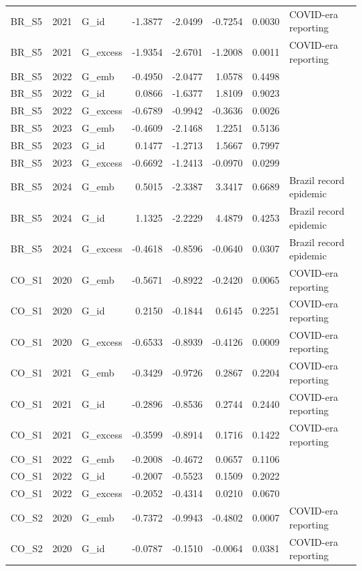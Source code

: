 \begin{tabular}{lllrrrrl}
BR\_S5 & 2021 & G\_id & -1.3877 & -2.0499 & -0.7254 & 0.0030 & COVID-era reporting \\
BR\_S5 & 2021 & G\_excess & -1.9354 & -2.6701 & -1.2008 & 0.0011 & COVID-era reporting \\
BR\_S5 & 2022 & G\_emb & -0.4950 & -2.0477 & 1.0578 & 0.4498 &  \\
BR\_S5 & 2022 & G\_id & 0.0866 & -1.6377 & 1.8109 & 0.9023 &  \\
BR\_S5 & 2022 & G\_excess & -0.6789 & -0.9942 & -0.3636 & 0.0026 &  \\
BR\_S5 & 2023 & G\_emb & -0.4609 & -2.1468 & 1.2251 & 0.5136 &  \\
BR\_S5 & 2023 & G\_id & 0.1477 & -1.2713 & 1.5667 & 0.7997 &  \\
BR\_S5 & 2023 & G\_excess & -0.6692 & -1.2413 & -0.0970 & 0.0299 &  \\
BR\_S5 & 2024 & G\_emb & 0.5015 & -2.3387 & 3.3417 & 0.6689 & Brazil record epidemic \\
BR\_S5 & 2024 & G\_id & 1.1325 & -2.2229 & 4.4879 & 0.4253 & Brazil record epidemic \\
BR\_S5 & 2024 & G\_excess & -0.4618 & -0.8596 & -0.0640 & 0.0307 & Brazil record epidemic \\
CO\_S1 & 2020 & G\_emb & -0.5671 & -0.8922 & -0.2420 & 0.0065 & COVID-era reporting \\
CO\_S1 & 2020 & G\_id & 0.2150 & -0.1844 & 0.6145 & 0.2251 & COVID-era reporting \\
CO\_S1 & 2020 & G\_excess & -0.6533 & -0.8939 & -0.4126 & 0.0009 & COVID-era reporting \\
CO\_S1 & 2021 & G\_emb & -0.3429 & -0.9726 & 0.2867 & 0.2204 & COVID-era reporting \\
CO\_S1 & 2021 & G\_id & -0.2896 & -0.8536 & 0.2744 & 0.2440 & COVID-era reporting \\
CO\_S1 & 2021 & G\_excess & -0.3599 & -0.8914 & 0.1716 & 0.1422 & COVID-era reporting \\
CO\_S1 & 2022 & G\_emb & -0.2008 & -0.4672 & 0.0657 & 0.1106 &  \\
CO\_S1 & 2022 & G\_id & -0.2007 & -0.5523 & 0.1509 & 0.2022 &  \\
CO\_S1 & 2022 & G\_excess & -0.2052 & -0.4314 & 0.0210 & 0.0670 &  \\
CO\_S2 & 2020 & G\_emb & -0.7372 & -0.9943 & -0.4802 & 0.0007 & COVID-era reporting \\
CO\_S2 & 2020 & G\_id & -0.0787 & -0.1510 & -0.0064 & 0.0381 & COVID-era reporting \\

\end{tabular}
